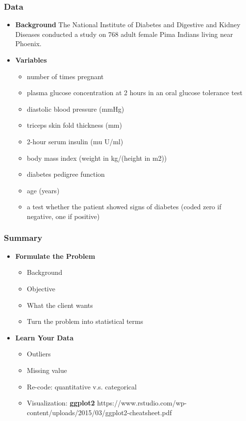 \documentclass[serif,mathserif,professionalfont]{beamer}
\begin{document}
\begin{frame}
	
	\frametitle{Data}
	
	
	\begin{itemize}
		\item \textbf{Background} \newline
		The National Institute of Diabetes and Digestive and Kidney Diseases conducted a study on 768 adult female Pima Indians living near Phoenix. 
		\item \textbf{Variables}
		\begin{itemize}
			\item number of times pregnant
			\item plasma glucose concentration at 2 hours in an oral glucose tolerance test
			\item diastolic blood pressure (mmHg)
			\item triceps skin fold thickness (mm)
			\item 2-hour serum insulin (mu U/ml)
			\item body mass index (weight in kg/(height in m2))
			\item diabetes pedigree function
			\item age (years)
			\item a test whether the patient showed signs of diabetes (coded zero if negative, one if positive)
		\end{itemize}
	\end{itemize}
	
	
	
\end{frame}


\begin{frame}
	
	\frametitle{Summary}
	
	
	\begin{itemize}
		\item \textbf{Formulate the Problem}
		\begin{itemize}
			\item Background
			\item Objective
			\item What the client wants
			\item Turn the problem into statistical terms
		\end{itemize}
		\item \textbf{Learn Your Data}
		\begin{itemize}
			\item Outliers
			\item Missing value
			\item Re-code: quantitative v.s. categorical
			\item Visualization: \textbf{ggplot2} \newline
			https://www.rstudio.com/wp-content/uploads/2015/03/ggplot2-cheatsheet.pdf
		\end{itemize}
	\end{itemize}
	
	
	
\end{frame}
\end{document}
